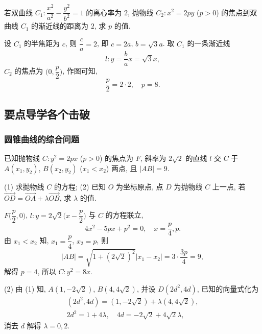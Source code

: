 \begin{exercise}
    若双曲线 $C_1\colon \dfrac{x^2}{a^2}- \dfrac{y^2}{b^2}=1$ 的离心率为 $2$, 抛物线 $C_2\colon x^2=2py$ ($p>0$) 的焦点到双曲线 $C_1$ 的渐近线的距离为 $2$, 求 $p$ 的值.
\end{exercise}
\beginsolution
    设 $C_1$ 的半焦距为 $c$, 则 $\dfrac{c}a= 2$, 即 $c=2a$, $b=\sqrt3a$. 取 $C_1$ 的一条渐近线
    \[l\colon y= \frac{b}a x= \sqrt3 x,\]
    $C_2$ 的焦点为 $\biggl(0,\dfrac{p}2\biggr)$, 作图可知,
    \[\frac{p}2= 2\cdot 2,\quad p=8.\]
\endsolution

\subsection{要点导学\quad 各个击破}
\subsubsection{圆锥曲线的综合问题}
\begin{example}
    已知抛物线 $C\colon y^2 =2px$ ($p>0$) 的焦点为 $F$,  斜率为 $2\sqrt2$ 的直线 $l$ 交 $C$ 于 $A(x_1, y_2)$, $B(x_2, y_2)$ ($x_1<x_2$) 两点, 且 $|AB|=9$.
    
    (1) 求抛物线 $C$ 的方程;\qquad
    (2) 已知 $O$ 为坐标原点, 点 $D$ 为抛物线 $C$ 上一点, 若 $\overrightarrow{OD}= \overrightarrow{OA}+ \lambda\overrightarrow{OB}$, 求 $\lambda$ 的值.
\end{example}
\beginsolution
    $F\biggl(\dfrac{p}2,0\biggr)$, $l\colon y=2\sqrt2\biggl(x-\dfrac{p}2\biggr)$ 与 $C$ 的方程联立,
    \[4x^2- 5px+ p^2=0,\quad x=\frac{p}4,p.\]
    由 $x_1<x_2$ 知, $x_1= \dfrac{p}4$, $x_2=p$, 则
    \[|AB|= \sqrt{1+(2\sqrt2)^2}|x_1-x_2|
    = 3\cdot \frac{3p}{4}= 9,\]
    解得 $p=4$, 所以 $C\colon y^2= 8x$.

    (2) 由 (1) 知, $A(1,-2\sqrt2)$, $B(4,4\sqrt2)$, 并设 $D(2d^2,4d)$, 已知的向量式化为
    \[\begin{gathered}
        (2d^2,4d)= (1,-2\sqrt2)+ \lambda(4,4\sqrt2),\\
        2d^2= 1+4\lambda,\quad 4d= -2\sqrt2+ 4\sqrt2\lambda,
    \end{gathered}\]
    消去 $d$ 解得 $\lambda= 0,2$.
\endsolution

